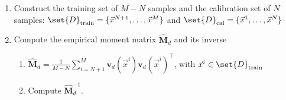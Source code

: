 \documentclass[pmlr]{jmlr}%
\begin{document}
\begin{algorithm2e}
\caption{Reach set approximation (without outliers)}
\label{alg:Reachability analysis without outliers}


   
\begin{enumerate}
  \itemsep=0ex
  \item[\texttt{\#}] Construct the training set of $M-N$ samples and the calibration set of $N$ samples:  
  $\set{D}_\mathrm{train} = \{\Vec{x}^{N+1},\ldots, \Vec{x}^{M}\}$ 
      and $\set{D}_\mathrm{cal} = \{ \Vec{x}^{1},\ldots, \Vec{x}^{N}\}$ 
  \item Compute the empirical moment matrix $\widehat{\mathbf{M}}_d$ and its inverse %
    \begin{enumerate}
      \itemsep=0ex
  \item $ \widehat{\mathbf{M}}_d =\frac{1}{M-N} \sum_{i=N+1}^{M} \mathbf{v}_{d}\left(\Vec{x}^{i}\right) \mathbf{v}_{d}\left(\Vec{x}^{i}\right)^{\top}$, with $\Vec{x}^{i}\in \set{D}_\mathrm{train}$
      \item Compute $\widehat{\mathbf{M}}^{-1}_d$.
       \end{enumerate} 
 

\end{enumerate}
\end{algorithm2e}
\end{document}
